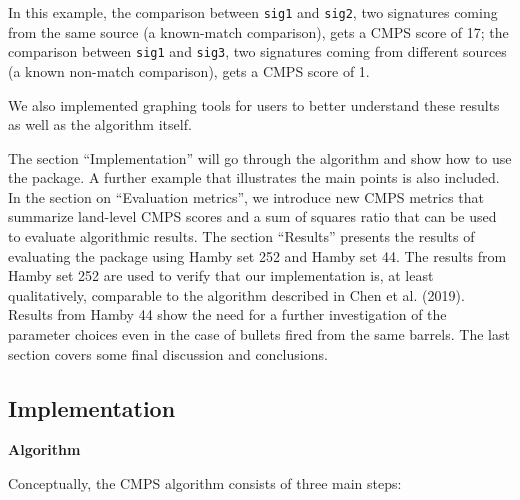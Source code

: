 In this example, the comparison between \texttt{sig1} and \texttt{sig2}, two signatures coming from the same source (a known-match comparison), gets a CMPS score of 17; the comparison between \texttt{sig1} and \texttt{sig3}, two signatures coming from different sources (a known non-match comparison), gets a CMPS score of 1.

We also implemented graphing tools for users to better understand these results as well as the algorithm itself.

The section ``Implementation'' will go through the algorithm and show how to use the  package.
A further example that illustrates the main points is also included.
In the section on ``Evaluation metrics'', we introduce new CMPS metrics that summarize land-level CMPS scores and a sum of squares ratio that can be used to evaluate algorithmic results.
The section ``Results'' presents the results of evaluating the  package using Hamby set 252 and Hamby set 44. The results from Hamby set 252 are used to verify that our implementation is, at least qualitatively, comparable to the algorithm described in Chen et al. (2019). Results from Hamby 44 show the need for a further investigation of the parameter choices even in the case of bullets fired from the same barrels.
The last section covers some final discussion and conclusions.

\hypertarget{implementation}{%
\subsection{Implementation}\label{implementation}}

\textbf{Algorithm}

Conceptually, the CMPS algorithm consists of three main steps:

